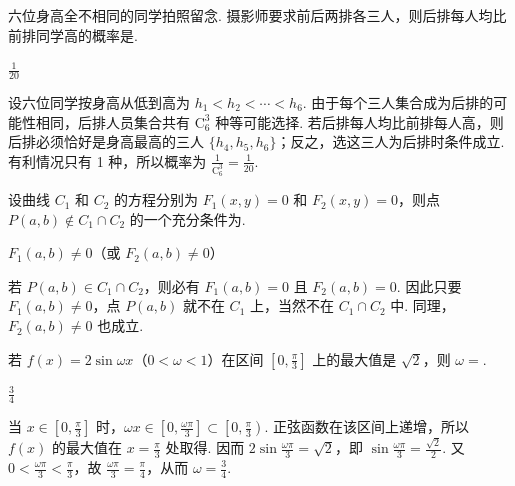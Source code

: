 \begin{problem}
六位身高全不相同的同学拍照留念. 摄影师要求前后两排各三人，则后排每人均比前排同学高的概率是\fillinblank{}.
\end{problem}

\begin{answer}
\(\frac{1}{20}\)
\end{answer}

\begin{solution}
设六位同学按身高从低到高为 \(h_1<h_2<\cdots<h_6\). 由于每个三人集合成为后排的可能性相同，后排人员集合共有 \(\mathrm C_6^3\) 种等可能选择.
若后排每人均比前排每人高，则后排必须恰好是身高最高的三人 \(\{h_4,h_5,h_6\}\)；反之，选这三人为后排时条件成立. 有利情况只有 1 种，所以概率为 \(\frac{1}{\mathrm C_6^3}=\frac{1}{20}\).
\end{solution}

\begin{problem}
设曲线 \(C_1\) 和 \(C_2\) 的方程分别为 \(F_1(x,y) = 0\) 和 \(F_2(x,y) = 0\)，则点 \(P(a,b) \notin C_1 \cap C_2\) 的一个充分条件为\fillinblank{}.
\end{problem}

\begin{answer}
\(F_1(a,b)\ne0\)（或 \(F_2(a,b)\ne0\)）
\end{answer}

\begin{solution}
若 \(P(a,b)\in C_1\cap C_2\)，则必有 \(F_1(a,b)=0\) 且 \(F_2(a,b)=0\). 因此只要 \(F_1(a,b)\ne0\)，点 \(P(a,b)\) 就不在 \(C_1\) 上，当然不在 \(C_1\cap C_2\) 中. 同理，\(F_2(a,b)\ne0\) 也成立.
\end{solution}

\begin{problem}
若 \( f(x) = 2 \sin \omega x \)（\(0 < \omega < 1\)）在区间 \( \left[0, \frac{\pi}{3}\right] \) 上的最大值是 \( \sqrt{2} \)，则 \( \omega = \)\fillinblank{}.
\end{problem}

\begin{answer}
\(\frac{3}{4}\)
\end{answer}

\begin{solution}
当 \(x\in\left[0,\frac{\pi}{3}\right]\) 时，\(\omega x\in\left[0,\frac{\omega\pi}{3}\right]\subset\left[0,\frac{\pi}{3}\right)\). 正弦函数在该区间上递增，所以 \(f(x)\) 的最大值在 \(x=\frac{\pi}{3}\) 处取得. 因而
\(2\sin\frac{\omega\pi}{3}=\sqrt2\)，即 \(\sin\frac{\omega\pi}{3}=\frac{\sqrt2}{2}\).
又 \(0<\frac{\omega\pi}{3}<\frac{\pi}{3}\)，故 \(\frac{\omega\pi}{3}=\frac{\pi}{4}\)，从而 \(\omega=\frac34\).
\end{solution}

